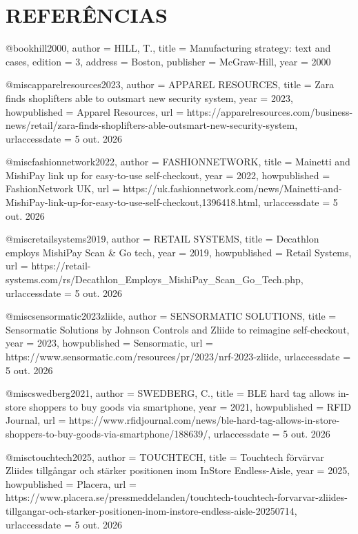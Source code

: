 \section*{REFERÊNCIAS}


@book{hill2000,
  author    = {HILL, T.},
  title     = {Manufacturing strategy: text and cases},
  edition   = {3},
  address   = {Boston},
  publisher = {McGraw-Hill},
  year      = {2000}
}

@misc{apparelresources2023,
  author       = {{APPAREL RESOURCES}},
  title        = {Zara finds shoplifters able to outsmart new security system},
  year         = {2023},
  howpublished = {Apparel Resources},
  url          = {https://apparelresources.com/business-news/retail/zara-finds-shoplifters-able-outsmart-new-security-system},
  urlaccessdate = {5 out. 2026}
}

@misc{fashionnetwork2022,
  author       = {{FASHIONNETWORK}},
  title        = {Mainetti and MishiPay link up for easy-to-use self-checkout},
  year         = {2022},
  howpublished = {FashionNetwork UK},
  url          = {https://uk.fashionnetwork.com/news/Mainetti-and-MishiPay-link-up-for-easy-to-use-self-checkout,1396418.html},
  urlaccessdate = {5 out. 2026}
}

@misc{retailsystems2019,
  author       = {{RETAIL SYSTEMS}},
  title        = {Decathlon employs MishiPay Scan \& Go tech},
  year         = {2019},
  howpublished = {Retail Systems},
  url          = {https://retail-systems.com/rs/Decathlon_Employs_MishiPay_Scan_Go_Tech.php},
  urlaccessdate = {5 out. 2026}
}

@misc{sensormatic2023zliide,
  author       = {{SENSORMATIC SOLUTIONS}},
  title        = {Sensormatic Solutions by Johnson Controls and Zliide to reimagine self-checkout},
  year         = {2023},
  howpublished = {Sensormatic},
  url          = {https://www.sensormatic.com/resources/pr/2023/nrf-2023-zliide},
  urlaccessdate = {5 out. 2026}
}

@misc{swedberg2021,
  author       = {SWEDBERG, C.},
  title        = {BLE hard tag allows in-store shoppers to buy goods via smartphone},
  year         = {2021},
  howpublished = {RFID Journal},
  url          = {https://www.rfidjournal.com/news/ble-hard-tag-allows-in-store-shoppers-to-buy-goods-via-smartphone/188639/},
  urlaccessdate = {5 out. 2026}
}

@misc{touchtech2025,
  author       = {{TOUCHTECH}},
  title        = {Touchtech förvärvar Zliides tillgångar och stärker positionen inom InStore Endless-Aisle},
  year         = {2025},
  howpublished = {Placera},
  url          = {https://www.placera.se/pressmeddelanden/touchtech-touchtech-forvarvar-zliides-tillgangar-och-starker-positionen-inom-instore-endless-aisle-20250714},
  urlaccessdate = {5 out. 2026}
}